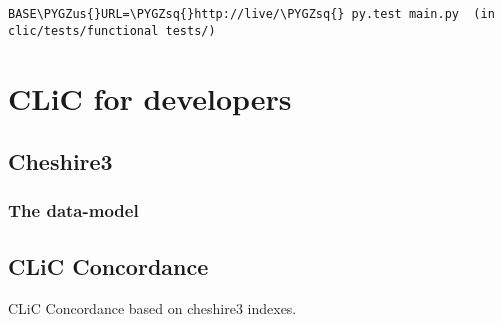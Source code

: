 \documentclass[letterpaper,10pt,english]{sphinxmanual}
\def\PYGZus{\char`\_}
\def\PYGZsq{\char`\'}
\renewcommand\PYGZsq{\textquotesingle}
\begin{document}
\begin{Verbatim}[commandchars=\\\{\}]
BASE\PYGZus{}URL=\PYGZsq{}http://live/\PYGZsq{} py.test main.py  (in
clic/tests/functional tests/)
\end{Verbatim}


\chapter{CLiC for developers}
\label{apidoc::doc}\label{apidoc:clic-for-developers}

\section{Cheshire3}
\label{apidoc:cheshire3}

\subsection{The data-model}
\label{apidoc:the-data-model}

\section{CLiC Concordance}
\label{apidoc:clic-concordance}\label{apidoc:module-concordance}
CLiC Concordance based on cheshire3 indexes.
\end{document}
